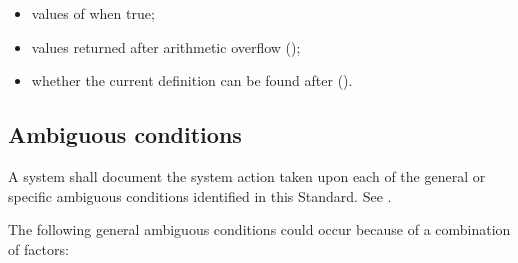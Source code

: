 \begin{itemize}
\item values of  when true;

\item values returned after arithmetic overflow
	();

\item whether the current definition can be found after
	 ().

\end{itemize}



\subsection{Ambiguous conditions} %

A system shall document the system action taken upon each of the
general or specific ambiguous conditions identified in this
Standard. See .

The following general ambiguous conditions could occur because of a
combination of factors:

